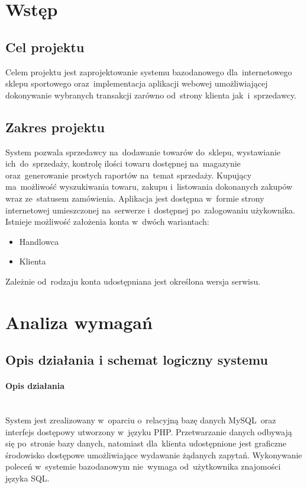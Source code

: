\documentclass[a4paper, 12pt]{article}
\begin{document}
\listoftables
{}
\cleardoublepage

\section{Wstęp}
\subsection{Cel projektu}
Celem projektu jest zaprojektowanie systemu bazodanowego dla~internetowego sklepu sportowego oraz~implementacja aplikacji webowej umożliwiającej dokonywanie wybranych transakcji zarówno od~strony klienta jak~i~sprzedawcy.
\subsection{Zakres projektu}
System pozwala sprzedawcy na~dodawanie towarów do~sklepu, wystawianie ich~do~sprzedaży, kontrolę ilości towaru dostępnej na~magazynie oraz~generowanie prostych raportów na~temat sprzedaży. Kupujący ma~możliwość wyszukiwania towaru, zakupu i~listowania dokonanych zakupów wraz ze~statusem zamówienia. Aplikacja jest dostępna w~formie strony internetowej umieszczonej na~serwerze i~dostępnej po~zalogowaniu użykownika. Istnieje możliwość założenia konta w~dwóch wariantach:
\begin{itemize}
	\item Handlowca
	\item Klienta
\end{itemize}
Zależnie od~rodzaju konta udostępniana jest określona wersja serwisu.
\cleardoublepage
\section{Analiza wymagań}
\subsection{Opis działania i schemat logiczny systemu}
\paragraph{Opis działania} \mbox{}\\
System jest zrealizowany w~oparciu o~relacyjną bazę danych MySQL~oraz interfejs dostępowy utworzony w~języku PHP. Przetwarzanie danych odbywają się po~stronie bazy danych, natomiast dla~klienta udostępnione jest graficzne środowisko dostępowe umożliwiające wydawanie żądanych zapytań. Wykonywanie poleceń w~systemie bazodanowym nie~wymaga od~użytkownika znajomości języka SQL.
\end{document}
